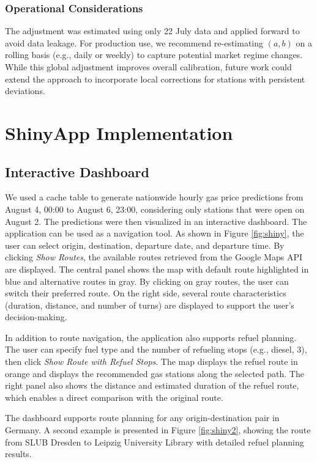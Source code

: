\subsubsection*{Operational Considerations}
The adjustment was estimated using only 22 July data and applied forward to avoid data leakage. For production use, we recommend re-estimating $(a,b)$ on a rolling basis (e.g., daily or weekly) to capture potential market regime changes. While this global adjustment improves overall calibration, future work could extend the approach to incorporate local corrections for stations with persistent deviations.



\section{ShinyApp Implementation}
\subsection{Interactive Dashboard}
We used a cache table to generate nationwide hourly gas price predictions from August 4, 00:00 to August 6, 23:00, considering only stations that were open on August 2. The predictions were then visualized in an interactive dashboard. The application can be used as a navigation tool. As shown in Figure \ref{fig:shiny}, the user can select origin, destination, departure date, and departure time. By clicking \textit{Show Routes}, the available routes retrieved from the Google Maps API are displayed. The central panel shows the map with default route highlighted in blue and alternative routes in gray. By clicking on gray routes, the user can switch their preferred route. On the right side, several route characteristics (duration, distance, and number of turns) are displayed to support the user’s decision-making.

In addition to route navigation, the application also supports refuel planning. The user can specify fuel type and the number of refueling stops (e.g., diesel, 3), then click \textit{Show Route with Refuel Stops}. The map displays the refuel route in orange and displays the recommended gas stations along the selected path. The right panel also shows the distance and estimated duration of the refuel route, which enables a direct comparison with the original route.  

The dashboard supports route planning for any origin-destination pair in Germany. A second example is presented in Figure \ref{fig:shiny2}, showing the route from SLUB Dresden to Leipzig University Library with detailed refuel planning results.

